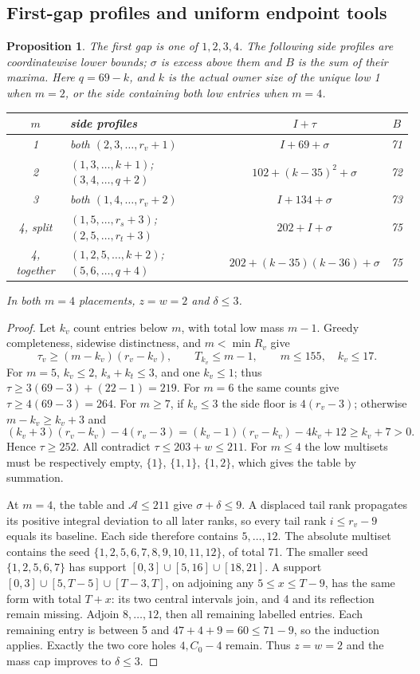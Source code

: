 \documentclass[11pt,letterpaper]{article}
\newtheorem{proposition}[theorem]{Proposition}
\theoremstyle{definition}\newtheorem{definition}[theorem]{Definition}
\begin{document}
\subsection{First-gap profiles and uniform endpoint tools}
\begin{proposition}\label{prop:p3-profiles}
The first gap is one of $1,2,3,4$. The following side profiles are
coordinatewise lower bounds; $\sigma$ is excess above them and $B$ is
the sum of their maxima. Here $q=69-k$, and $k$ is the actual owner size of the unique
low 1 when $m=2$, or the side containing both low entries when $m=4$.
\begin{center}\small
\begin{tabular}{c|l|c|c}
$m$&side profiles&$I+\tau$&$B$\\\hline
1&both $(2,3,\ldots,r_v+1)$&$I+69+\sigma$&71\\
2&$(1,3,\ldots,k+1)$; $(3,4,\ldots,q+2)$&$102+(k-35)^2+\sigma$&72\\
3&both $(1,4,\ldots,r_v+2)$&$I+134+\sigma$&73\\
4, split&$(1,5,\ldots,r_s+3)$; $(2,5,\ldots,r_t+3)$&$202+I+\sigma$&75\\
4, together&$(1,2,5,\ldots,k+2)$; $(5,6,\ldots,q+4)$&$202+(k-35)(k-36)+\sigma$&75
\end{tabular}
\end{center}
In both $m=4$ placements, $z=w=2$ and $\delta\le3$.
\end{proposition}
\begin{proof}
Let $k_v$ count entries below $m$, with total low mass $m-1$.
Greedy completeness, sidewise distinctness, and $m<\min R_v$ give
\[
\tau_v\ge(m-k_v)(r_v-k_v),\qquad T_{k_v}\le m-1,
\qquad m\le155,\quad k_v\le17.
\]
For $m=5$, $k_v\le2$, $k_s+k_t\le3$, and one $k_v\le1$; thus
$\tau\ge3(69-3)+(22-1)=219$. For $m=6$ the same counts give
$\tau\ge4(69-3)=264$. For $m\ge7$, if $k_v\le3$ the side floor is
$4(r_v-3)$; otherwise $m-k_v\ge k_v+3$ and
\[
(k_v+3)(r_v-k_v)-4(r_v-3)
=(k_v-1)(r_v-k_v)-4k_v+12\ge k_v+7>0.
\]
Hence $\tau\ge252$. All contradict $\tau\le203+w\le211$.
For $m\le4$ the low multisets must be respectively empty, $\{1\}$,
$\{1,1\}$, $\{1,2\}$, which gives the table by summation.

At $m=4$, the table and $\mathcal A\le211$ give $\sigma+\delta\le9$.
A displaced tail rank propagates its positive integral deviation to all
later ranks, so every tail rank $i\le r_v-9$ equals its baseline.
Each side therefore contains $5,\ldots,12$. The absolute multiset
contains the seed $\{1,2,5,6,7,8,9,10,11,12\}$, of total 71.
The smaller seed $\{1,2,5,6,7\}$ has support
$[0,3]\cup[5,16]\cup[18,21]$. A support
$[0,3]\cup[5,T-5]\cup[T-3,T]$, on adjoining any $5\le x\le T-9$,
has the same form with total $T+x$: its two central intervals join,
and 4 and its reflection remain missing. Adjoin $8,\ldots,12$, then
all remaining labelled entries. Each remaining entry is between 5 and
$47+4+9=60\le71-9$, so the induction applies. Exactly the two core
holes $4,C_0-4$ remain. Thus $z=w=2$ and the mass cap improves to
$\delta\le3$.
\end{proof}
\end{document}
